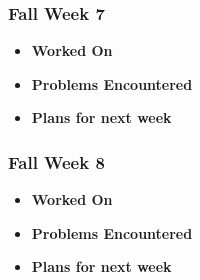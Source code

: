 \documentclass[compsoc,draftclsnofoot,onecolumn,10pt]{IEEEtran}
\begin{document}
\subsubsection{Fall Week 7}
\begin{itemize}
    \item {\textbf{Worked On}}
    \begin{itemize}
        
    \end{itemize}

    \item {\textbf{Problems Encountered}}
    \begin{itemize}
        
    \end{itemize}

    \item{\textbf{Plans for next week}}
    \begin{itemize}
        
    \end{itemize}

\end{itemize}

\subsubsection{Fall Week 8}
\begin{itemize}
    \item {\textbf{Worked On}}
    \begin{itemize}
        
    \end{itemize}

    \item {\textbf{Problems Encountered}}
    \begin{itemize}
        
    \end{itemize}

    \item{\textbf{Plans for next week}}
    \begin{itemize}
        
    \end{itemize}

\end{itemize}
\end{document}
